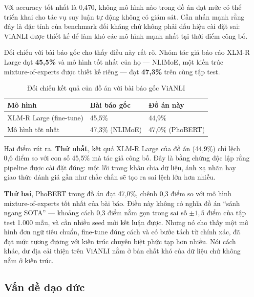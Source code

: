 \documentclass[12pt,a4paper,oneside]{report}
\begin{document}
Với accuracy tốt nhất là 0,470, không mô hình nào trong đồ án đạt mức có thể triển khai
cho tác vụ suy luận tự động không có giám sát. Cần nhấn mạnh rằng đây là đặc tính của
benchmark đối kháng chứ không phải dấu hiệu cài đặt sai: ViANLI được thiết kế để làm khó
các mô hình mạnh nhất tại thời điểm công bố.

Đối chiếu với bài báo gốc \cite{vianli} cho thấy điều này rất rõ. Nhóm tác giả báo cáo
XLM-R Large đạt \textbf{45,5\%} và mô hình tốt nhất của họ --- NLIMoE, một kiến trúc
mixture-of-experts được thiết kế riêng --- đạt \textbf{47,3\%} trên cùng tập test.

\begin{table}[H]
\centering
\caption{Đối chiếu kết quả của đồ án với bài báo gốc ViANLI}
\begin{tabularx}{\textwidth}{@{}Y C{3.0cm}C{3.0cm}@{}}
\toprule
\textbf{Mô hình} & \textbf{Bài báo gốc} & \textbf{Đồ án này} \\
\midrule
XLM-R Large (fine-tune) & 45,5\% & 44,9\% \\
Mô hình tốt nhất & 47,3\% (NLIMoE) & 47,0\% (PhoBERT) \\
\bottomrule
\end{tabularx}
\end{table}

Hai điểm rút ra. \textbf{Thứ nhất}, kết quả XLM-R Large của đồ án (44,9\%) chỉ lệch 0,6
điểm so với con số 45,5\% mà tác giả công bố. Đây là bằng chứng độc lập rằng pipeline
được cài đặt đúng: một lỗi trong khâu chia dữ liệu, ánh xạ nhãn hay giao thức đánh giá gần
như chắc chắn sẽ tạo ra sai lệch lớn hơn nhiều.

\textbf{Thứ hai}, PhoBERT trong đồ án đạt 47,0\%, chênh 0,3 điểm so với mô hình
mixture-of-experts tốt nhất của bài báo. Điều này không có nghĩa đồ án ``sánh ngang
SOTA'' --- khoảng cách 0,3 điểm nằm gọn trong sai số $\pm 1{,}5$ điểm của tập test 1.000
mẫu, và cần nhiều seed mới kết luận được. Nhưng nó cho thấy một mô hình đơn ngữ tiêu
chuẩn, fine-tune đúng cách và có bước tách từ chính xác, đã đạt mức tương đương với kiến
trúc chuyên biệt phức tạp hơn nhiều. Nói cách khác, dư địa cải thiện trên ViANLI nằm ở
bản chất khó của dữ liệu chứ không nằm ở kiến trúc.

\subsection{Vấn đề đạo đức}
\end{document}
